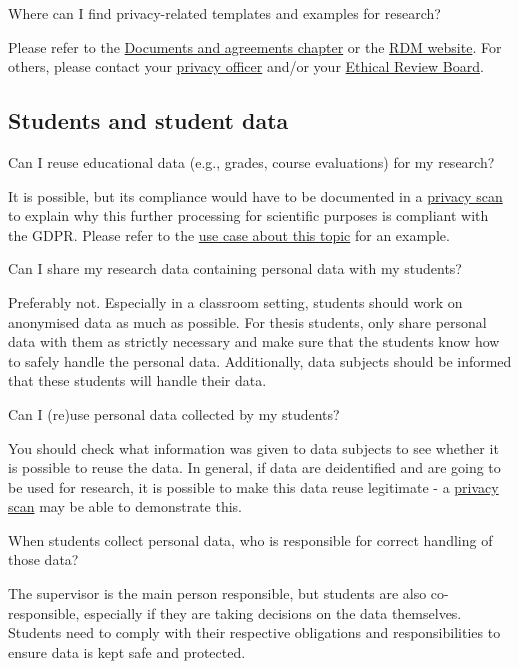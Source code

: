 \documentclass[
]{book}
\begin{document}
Where can I find privacy-related templates and examples for research?

Please refer to the \protect\hyperlink{legal-documents}{Documents and agreements chapter} or the \href{https://www.uu.nl/rdm}{RDM website}. For others, please contact your \href{https://intranet.uu.nl/en/knowledgebase/privacyofficers}{privacy officer} and/or your \href{https://intranet.uu.nl/en/knowledgebase/ethics-assessment}{Ethical Review Board}.

\hypertarget{students}{%
\subsection{Students and student data}\label{students}}

Can I reuse educational data (e.g., grades, course evaluations) for my research?

It is possible, but its compliance would have to be documented in a \protect\hyperlink{privacy-scan}{privacy scan} to explain why this further processing for scientific purposes is compliant with the GDPR. Please refer to the \protect\hyperlink{reuse-education-data}{use case about this topic} for an example.

Can I share my research data containing personal data with my students?

Preferably not. Especially in a classroom setting, students should work on anonymised data as much as possible. For thesis students, only share personal data with them as strictly necessary and make sure that the students know how to safely handle the personal data. Additionally, data subjects should be informed that these students will handle their data.

Can I (re)use personal data collected by my students?

You should check what information was given to data subjects to see whether it is possible to reuse the data. In general, if data are deidentified and are going to be used for research, it is possible to make this data reuse legitimate - a \protect\hyperlink{privacy-scan}{privacy scan} may be able to demonstrate this.

When students collect personal data, who is responsible for correct handling of those data?

The supervisor is the main person responsible, but students are also co-responsible, especially if they are taking decisions on the data themselves. Students need to comply with their respective obligations and responsibilities to ensure data is kept safe and protected.
\end{document}
